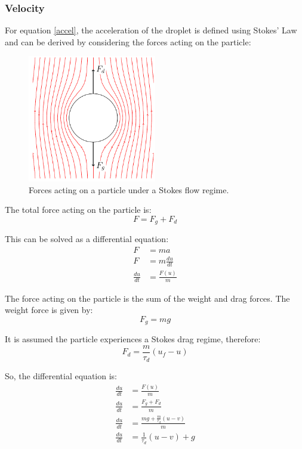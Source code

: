 \documentclass[../Interim_Report_Master]{subfiles}
\begin{document}
\subsubsection{Velocity}
For equation \ref{accel}, the acceleration of the droplet is defined using Stokes' Law and can be derived by considering the forces acting on the particle:
\begin{figure}
	\centering
	\includegraphics[width=0.5\textwidth]{./Diagrams/Particle_Forces/Particle_Forces.pdf}
	\caption{Forces acting on a particle under a Stokes flow regime.}
	\label{particle_forces}
\end{figure}

The total force acting on the particle is:
\begin{equation}
F = F_g + F_d
\end{equation}

This can be solved as a differential equation:
\begin{subequations}
	\begin{align}
	F &= ma \\
	F &= m\frac{du}{dt} \\
	\frac{du}{dt} &= \frac{F(u)}{m}
	\end{align}
\end{subequations}

The force acting on the particle is the sum of the weight and drag forces. The weight force is given by:
\begin{equation}
F_g = mg
\end{equation}

It is assumed the particle experiences a Stokes drag regime, therefore:
\begin{equation}
F_d = \frac{m}{\tau_d}(u_f-u)
\end{equation}

So, the differential equation is:
\begin{subequations}
	\begin{align}
	\frac{du}{dt} &= \frac{F(u)}{m} \\
	\frac{du}{dt} &= \frac{F_g + F_d}{m} \\
	\frac{du}{dt} &= \frac{mg + \frac{m}{\tau_d}(u-v)}{m} \\
	\frac{du}{dt} &= \frac{1}{\tau_d}(u-v) + g
	\end{align}
\end{subequations}
\end{document}
